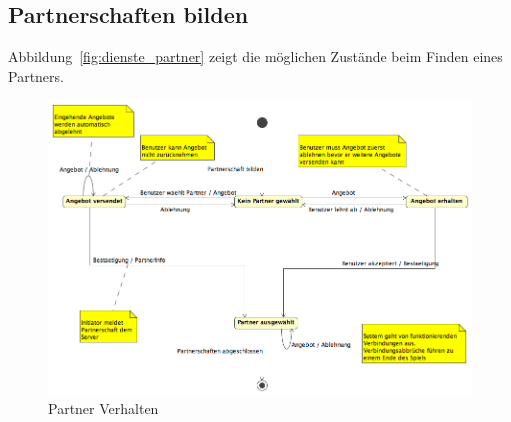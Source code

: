 \documentclass[12pt,halfparskip]{scrartcl}
\begin{document}
\clearpage
\subsection{Partnerschaften bilden} %
\label{sub:partnerschaften_bilden}
Abbildung~\vref{fig:dienste_partner} zeigt die möglichen Zustände beim Finden eines Partners.
\begin{figure}[h]
	\centering
	\includegraphics[width=\textwidth]{dienste_partner}
	\caption{Partner Verhalten}
	\label{fig:dienste_partner}
\end{figure}
\end{document}
